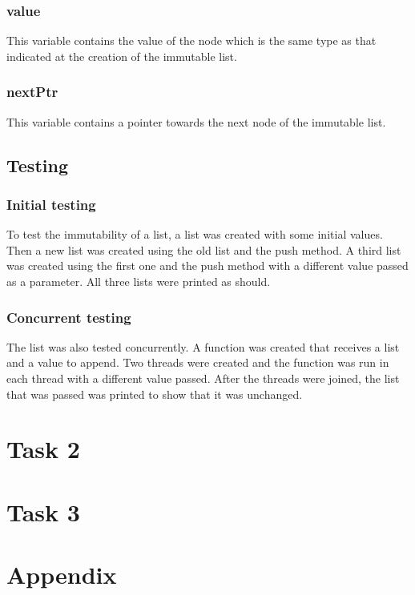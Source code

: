 \documentclass[a4paper, 12pt]{report}
\begin{document}
\subsubsection{value}
This variable contains the value of the node which is the same type as that indicated at the creation of the immutable list.

\subsubsection{nextPtr}
This variable contains a pointer towards the next node of the immutable list.

\subsection{Testing}
\subsubsection{Initial testing}
To test the immutability of a list, a list was created with some initial values. Then a new list was created using the old list and the push method. A third list was created using the first one and the push method with a different value passed as a parameter. All three lists were printed as should.

\subsubsection{Concurrent testing}
The list was also tested concurrently. A function was created that receives a list and a value to append. Two threads were created and the function was run in each thread with a different value passed. After the threads were joined, the list that was passed was printed to show that it was unchanged.

\section{Task 2}
\section{Task 3}
\section{Appendix}

% 
\end{document}

